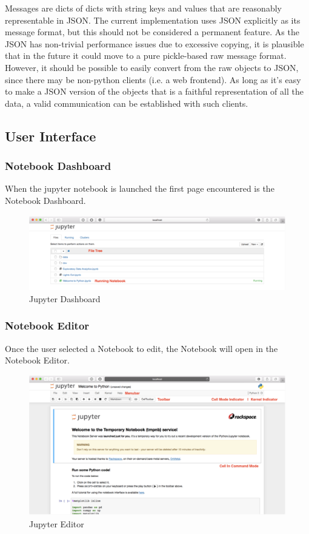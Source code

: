 Messages are dicts of dicts with string keys and values that are reasonably representable
in JSON. The current implementation uses JSON explicitly as its message format, but this
should not be considered a permanent feature. As the JSON has non-trivial performance
issues due to excessive copying, it is plausible that in the future it could move to a
pure pickle-based raw message format. However, it should be possible to easily convert
from the raw objects to JSON, since there may be non-python clients (i.e. a web
frontend). As long as it's easy to make a JSON version of the objects that is a faithful
representation of all the data, a valid communication can be established with such
clients.

\subsection{User Interface}

\subsubsection{Notebook Dashboard}
 
When the jupyter notebook is launched the first page encountered is the Notebook Dashboard. 

\begin{figure}[ht]\centering
  \includegraphics[width=\textwidth]{Dashboard}
  \caption{Jupyter Dashboard}\label{fig:dashboard}
\end{figure} 

\subsubsection{Notebook Editor}
 
Once the user selected a Notebook to edit, the Notebook will open in the Notebook Editor. 

\begin{figure}[ht]\centering
  \includegraphics[width=\textwidth]{Editor}
  \caption{Jupyter Editor}\label{fig:editor}
\end{figure} 

